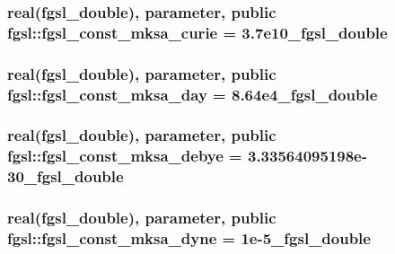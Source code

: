 \hypertarget{classfgsl_a96bbfcd3e0e6a9190e86a1a909b7407b}{
\subsubsection[{fgsl\-\_\-const\-\_\-mksa\-\_\-curie}]{\setlength{\rightskip}{0pt plus 5cm}real({\bf fgsl\-\_\-double}), parameter, public fgsl\-::fgsl\-\_\-const\-\_\-mksa\-\_\-curie = 3.\-7e10\-\_\-fgsl\-\_\-double}}\label{classfgsl_a96bbfcd3e0e6a9190e86a1a909b7407b}
\hypertarget{classfgsl_af69acf253e04452510d9ec67efa458d2}{
\subsubsection[{fgsl\-\_\-const\-\_\-mksa\-\_\-day}]{\setlength{\rightskip}{0pt plus 5cm}real({\bf fgsl\-\_\-double}), parameter, public fgsl\-::fgsl\-\_\-const\-\_\-mksa\-\_\-day = 8.\-64e4\-\_\-fgsl\-\_\-double}}\label{classfgsl_af69acf253e04452510d9ec67efa458d2}
\hypertarget{classfgsl_ad4022c36598c9b49cb3bc9497fcdc06c}{
\subsubsection[{fgsl\-\_\-const\-\_\-mksa\-\_\-debye}]{\setlength{\rightskip}{0pt plus 5cm}real({\bf fgsl\-\_\-double}), parameter, public fgsl\-::fgsl\-\_\-const\-\_\-mksa\-\_\-debye = 3.\-33564095198e-\/30\-\_\-fgsl\-\_\-double}}\label{classfgsl_ad4022c36598c9b49cb3bc9497fcdc06c}
\hypertarget{classfgsl_a17365a3e64a2dd83aea9ebba6757fd7b}{
\subsubsection[{fgsl\-\_\-const\-\_\-mksa\-\_\-dyne}]{\setlength{\rightskip}{0pt plus 5cm}real({\bf fgsl\-\_\-double}), parameter, public fgsl\-::fgsl\-\_\-const\-\_\-mksa\-\_\-dyne = 1e-\/5\-\_\-fgsl\-\_\-double}}\label{classfgsl_a17365a3e64a2dd83aea9ebba6757fd7b}
